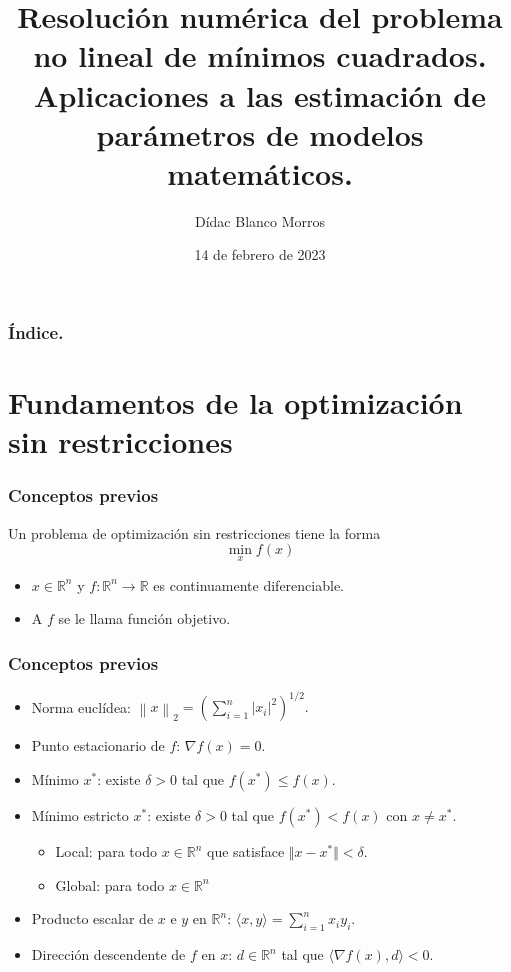 \documentclass{beamer}
\title
{Resolución numérica del problema no lineal de mínimos cuadrados.
Aplicaciones a las estimación de parámetros de modelos matemáticos.}
\author
{Dídac Blanco Morros}
\date
{14 de febrero de 2023}
\newcommand{\norm}[1]{\left\lVert#1\right\rVert}
\begin{document}
\frame{\titlepage}

\begin{frame}
\frametitle{Índice.} %
\tableofcontents
\end{frame}

\section{Fundamentos de la optimización sin restricciones}
\begin{frame}
    \frametitle{Conceptos previos}
    \begin{block}{}
        Un problema de optimización sin restricciones tiene la forma
        \begin{equation*}
            \min_x f(x)
        \end{equation*}
        \end{block}
    \begin{itemize}
        \item $x\in \mathbb{R}^n$ y $f:\mathbb{R}^n \to \mathbb{R}$ es continuamente diferenciable.
        \item A $f$ se le llama función objetivo.
    \end{itemize}
\end{frame}

\begin{frame}
    \frametitle{Conceptos previos}
    \begin{itemize}[label=\textbullet]
    \item Norma euclídea: $
            \norm{x}_2 = \left( \sum_{i=1}^n \vert x_i \vert^2 \right)^{1/2}.
        $\pause
    \item Punto estacionario de $f$: $\nabla f(x) = 0$.\pause 
    \item Mínimo $x^*$: existe $\delta > 0$ tal que $f(x^*) \leq f(x)$.\pause 
    \item Mínimo estricto $x^*$: existe $\delta > 0$ tal que $f(x^*) < f(x)$ con $x \neq x^*$.\pause 
    \begin{itemize}[label=-]
        \item Local: para todo $x \in \mathbb{R}^n$ que satisface $\Vert x - x^* \Vert < \delta$. 
        \item Global: para todo $x \in \mathbb{R}^n$
    \end{itemize}\pause 
    \item Producto escalar de $x$ e $y$ en $\mathbb{R}^n$: $\langle x,y \rangle = \sum_{i=1}^n x_i y_i$.\pause 
    \item Dirección descendente de $f$ en $x$: $d \in \mathbb{R}^n$ tal que $\langle \nabla f(x), d \rangle < 0$.
    \end{itemize}
\end{frame}
\end{document}
